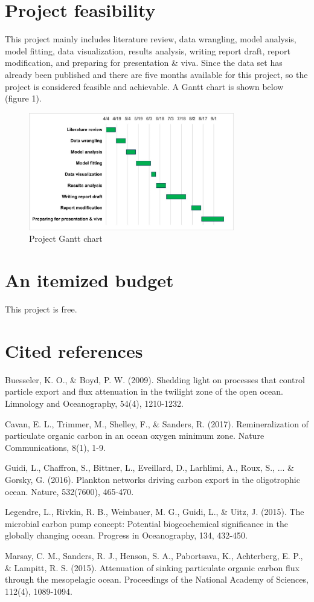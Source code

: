 \documentclass[11pt, a4paper]{article}
\begin{document}
\section{Project feasibility}
This project mainly includes literature review, data wrangling, model analysis, model fitting, data visualization, results analysis, writing report draft, report modification, and preparing for presentation \& viva. Since the data set has already been published and there are five months available for this project, so the project is considered feasible and achievable. A Gantt chart is shown below (figure 1).
\begin{figure}[H]
    \centering
    \includegraphics[width=0.8\textwidth]{gantt.jpg}
    \caption{Project Gantt chart}
    \label{figure1}
\end{figure}
\section{An itemized budget}
This project is free.
\section{Cited references}
 Buesseler, K. O., \& Boyd, P. W. (2009). Shedding light on processes that control particle export and flux attenuation in the twilight zone of the open ocean. Limnology and Oceanography, 54(4), 1210-1232.

Cavan, E. L., Trimmer, M., Shelley, F., \& Sanders, R. (2017). Remineralization of particulate organic carbon in an ocean oxygen minimum zone. Nature Communications, 8(1), 1-9.

Guidi, L., Chaffron, S., Bittner, L., Eveillard, D., Larhlimi, A., Roux, S., ... \& Gorsky, G. (2016). Plankton networks driving carbon export in the oligotrophic ocean. Nature, 532(7600), 465-470.

Legendre, L., Rivkin, R. B., Weinbauer, M. G., Guidi, L., \& Uitz, J. (2015). The microbial carbon pump concept: Potential biogeochemical significance in the globally changing ocean. Progress in Oceanography, 134, 432-450.

Marsay, C. M., Sanders, R. J., Henson, S. A., Pabortsava, K., Achterberg, E. P., \& Lampitt, R. S. (2015). Attenuation of sinking particulate organic carbon flux through the mesopelagic ocean. Proceedings of the National Academy of Sciences, 112(4), 1089-1094.
\end{document}
